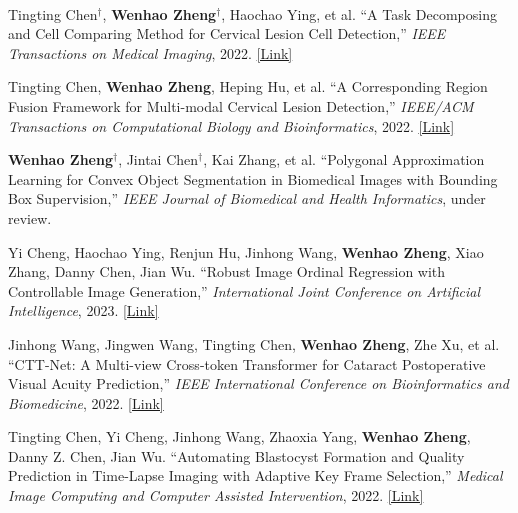 
\begin{cventries}

    \cventry
    {} %
    {\ } %
    {\ } %
    {} %
    {
        \vspace{-8mm}
        \begin{cvitemize2}
            \item Tingting Chen$^\dagger$, \textbf{Wenhao Zheng$^\dagger$}, Haochao Ying, et al. ``A Task Decomposing and Cell Comparing Method for Cervical Lesion Cell Detection,'' \textit{IEEE Transactions on Medical Imaging}, 2022. \href{https://ieeexplore.ieee.org/document/9744114}{\textcolor{link}{[Link]}}
            \vspace{1mm}
            \item Tingting Chen, \textbf{Wenhao Zheng}, Heping Hu, et al. ``A Corresponding Region Fusion Framework for Multi-modal Cervical Lesion Detection,'' \textit{IEEE/ACM Transactions on Computational Biology and Bioinformatics}, 2022. \href{https://ieeexplore.ieee.org/document/9784879}{\textcolor{link}{[Link]}}
            \vspace{1mm}
            \item \textbf{Wenhao Zheng$^\dagger$}, Jintai Chen$^\dagger$, Kai Zhang, et al. ``Polygonal Approximation Learning for Convex Object Segmentation in Biomedical Images with Bounding Box Supervision,'' \textit{IEEE Journal of Biomedical and Health Informatics}, under review.
            \vspace{1mm}
            \item Yi Cheng, Haochao Ying, Renjun Hu, Jinhong Wang, \textbf{Wenhao Zheng}, Xiao Zhang, Danny Chen, Jian Wu. ``Robust Image Ordinal Regression with Controllable Image Generation,'' \textit{International Joint Conference on Artificial Intelligence}, 2023. \href{https://arxiv.org/abs/2305.04213}{\textcolor{link}{[Link]}}
            \vspace{1mm}
            \item Jinhong Wang, Jingwen Wang, Tingting Chen, \textbf{Wenhao Zheng}, Zhe Xu, et al. ``CTT-Net: A Multi-view Cross-token Transformer for Cataract Postoperative Visual Acuity Prediction,'' \textit{IEEE International Conference on Bioinformatics and Biomedicine}, 2022. \href{https://ieeexplore.ieee.org/document/9995392}{\textcolor{link}{[Link]}}
            \vspace{1mm}
            \item Tingting Chen, Yi Cheng, Jinhong Wang, Zhaoxia Yang, \textbf{Wenhao Zheng}, Danny Z. Chen, Jian Wu. ``Automating Blastocyst Formation and Quality Prediction in Time-Lapse Imaging with Adaptive Key Frame Selection,'' \textit{Medical Image Computing and Computer Assisted Intervention}, 2022. \href{https://link.springer.com/chapter/10.1007/978-3-031-16440-8_43}{\textcolor{link}{[Link]}}
        \end{cvitemize2}
    }
\end{cventries}
